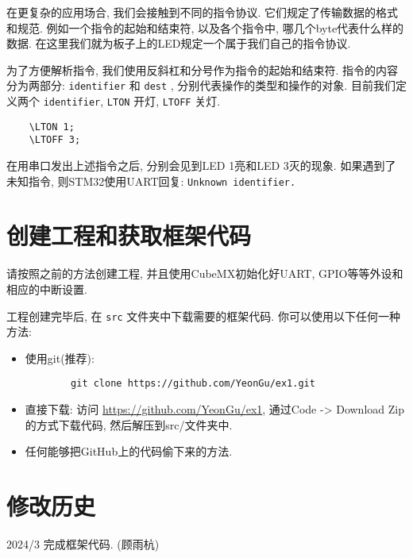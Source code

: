在更复杂的应用场合, 我们会接触到不同的指令协议. 它们规定了传输数据的格式和规范. 例如一个指令的起始和结束符, 以及各个指令中, 哪几个byte代表什么样的数据. 在这里我们就为板子上的LED规定一个属于我们自己的指令协议.

为了方便解析指令, 我们使用反斜杠和分号作为指令的起始和结束符. 指令的内容分为两部分: \verb|identifier| 和 \verb|dest| , 分别代表操作的类型和操作的对象. 目前我们定义两个 \verb|identifier|, \verb|LTON| 开灯, \verb|LTOFF| 关灯.

\begin{lstlisting}
	\LTON 1;
	\LTOFF 3;
\end{lstlisting}

在用串口发出上述指令之后, 分别会见到LED 1亮和LED 3灭的现象. 如果遇到了未知指令, 则STM32使用UART回复: \verb|Unknown identifier.|

\section{创建工程和获取框架代码}

请按照之前的方法创建工程, 并且使用CubeMX初始化好UART, GPIO等等外设和相应的中断设置.

工程创建完毕后, 在 \verb|src| 文件夹中下载需要的框架代码. 你可以使用以下任何一种方法:

\begin{itemize}
	\item 使用git(推荐): \begin{lstlisting}
		git clone https://github.com/YeonGu/ex1.git
	\end{lstlisting}
	\item 直接下载: 访问 \href{https://github.com/YeonGu/ex1}{https://github.com/YeonGu/ex1}, 通过Code -> Download Zip的方式下载代码, 然后解压到src/文件夹中.
	\item 任何能够把GitHub上的代码偷下来的方法.
\end{itemize}


\section{修改历史}

2024/3 完成框架代码. (顾雨杭)
